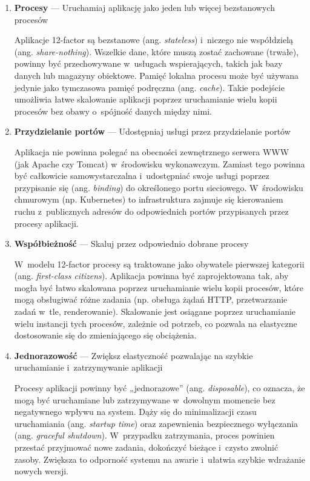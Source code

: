 \begin{enumerate}[label=\Roman*., font=\bfseries]
    \item \textbf{Procesy} --- Uruchamiaj aplikację jako jeden lub więcej bezstanowych procesów

          Aplikacje 12-factor są bezstanowe (ang. \textit{stateless}) i~niczego nie współdzielą (ang. \textit{share-nothing}).
          Wszelkie dane, które muszą zostać zachowane (trwałe), powinny być przechowywane w~usługach wspierających, takich jak bazy danych lub magazyny obiektowe.
          Pamięć lokalna procesu może być używana jedynie jako tymczasowa pamięć podręczna (ang. \textit{cache}).
          Takie podejście umożliwia łatwe skalowanie aplikacji poprzez uruchamianie wielu kopii procesów bez obawy o~spójność danych między nimi.

    \item \textbf{Przydzielanie portów} --- Udostępniaj usługi przez przydzielanie portów

          Aplikacja nie powinna polegać na obecności zewnętrznego serwera WWW (jak Apache czy Tomcat) w~środowisku wykonawczym.
          Zamiast tego powinna być całkowicie samowystarczalna i~udostępniać swoje usługi poprzez przypisanie się (ang. \textit{binding}) do określonego portu sieciowego.
          W~środowisku chmurowym (np. Kubernetes) to infrastruktura zajmuje się kierowaniem ruchu z~publicznych adresów do odpowiednich portów przypisanych przez procesy aplikacji.

    \item \textbf{Współbieżność} --- Skaluj przez odpowiednio dobrane procesy

          W~modelu 12-factor procesy są traktowane jako obywatele pierwszej kategorii (ang. \textit{first-class citizens}).
          Aplikacja powinna być zaprojektowana tak, aby mogła być łatwo skalowana poprzez uruchamianie wielu kopii procesów, które mogą obsługiwać różne zadania (np. obsługa żądań HTTP, przetwarzanie zadań w~tle, renderowanie).
          Skalowanie jest osiągane poprzez uruchamianie wielu instancji tych procesów, zależnie od potrzeb, co pozwala na elastyczne dostosowanie się do zmieniającego się obciążenia.

    \item \textbf{Jednorazowość} --- Zwiększ elastyczność pozwalając na szybkie uruchamianie i~zatrzymywanie aplikacji

          Procesy aplikacji powinny być „jednorazowe” (ang. \textit{disposable}), co oznacza, że mogą być uruchamiane lub zatrzymywane w~dowolnym momencie bez negatywnego wpływu na system.
          Dąży się do minimalizacji czasu uruchamiania (ang. \textit{startup time}) oraz zapewnienia bezpiecznego wyłączania (ang. \textit{graceful shutdown}).
          W~przypadku zatrzymania, proces powinien przestać przyjmować nowe zadania, dokończyć bieżące i~czysto zwolnić zasoby.
          Zwiększa to odporność systemu na awarie i~ułatwia szybkie wdrażanie nowych wersji.


\end{enumerate}
